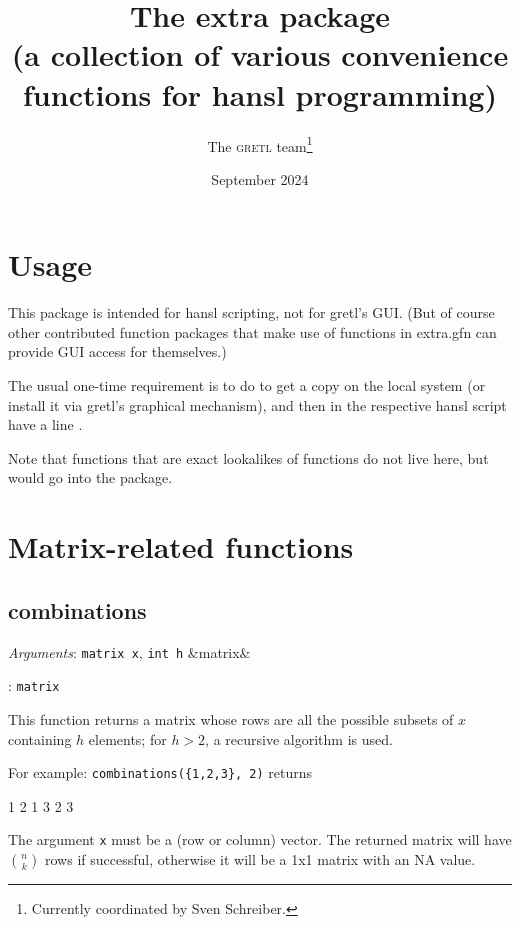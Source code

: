 \documentclass[11pt,english]{article}
\newcommand{\noun}[1]{\textsc{#1}}
\newcommand{\ArgRet}[2]{%
  {\it Arguments}: {#1}%
  \ifx&#2&%
  \else
  \par\smallskip\noindent {\it Return type}: \texttt{#2}
  \fi%
  \par\medskip\par%
  }
\begin{document}
\title{The extra package\\
(a collection of various convenience functions for hansl programming) }

\date{September 2024}

\author{The \noun{gretl} team\thanks{Currently coordinated by Sven
Schreiber.}}

\maketitle
\tableofcontents{}

\section{Usage}

This package is intended for hansl scripting, not for gretl's GUI.
(But of course other contributed function packages that make use of
functions in extra.gfn can provide GUI access for themselves.)

The usual one-time requirement is to do 
to get a copy on the local system (or install it via gretl's graphical
mechanism), and then in the respective hansl script have a line .

Note that functions that are exact lookalikes of 
functions do not live here, but would go into the
 package.


\section{Matrix-related functions}

\subsection{combinations}

\ArgRet{\texttt{matrix x}, \texttt{int h}}{matrix} This function
returns a matrix whose rows are all the possible subsets of $x$
containing $h$ elements; for $h>2$, a recursive algorithm is used.

For example: \texttt{combinations(\{1,2,3\}, 2)} returns
\begin{code}
         1   2
         1   3
         2   3
\end{code}

The argument \texttt{x} must be a (row or column) vector. The returned
matrix will have $n \choose k$ rows if successful, otherwise it will be a 1x1
matrix with an NA value.
\end{document}

